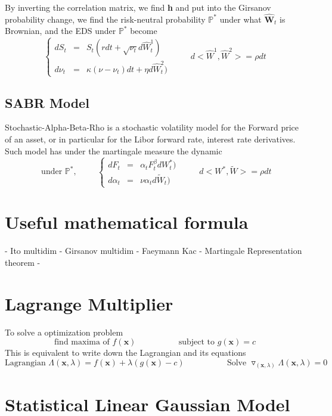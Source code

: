 \documentclass[a4paper,10pt]{article}
\begin{document}
By inverting the correlation matrix, we find \textbf{h} and put into the Girsanov probability change, we find the risk-neutral probability $\mathbb{P}^*$ under what $\hat{\textbf{W}}_t$ is Brownian, and the EDS under $\mathbb{P}^*$ become
\[
\left\{ 
\begin{array}{rcl}
dS_t    &=& S_t( r dt + \sqrt{\nu_t} d \hat{W}^{1}_t )  \\ 
d\nu_t  &=& \kappa( \nu -\nu_t ) dt + \eta d \hat{W}^{2}_t )
\end{array}\right. 
\hspace{1cm}
d<\hat{W}^{1},\hat{W}^{2}> = \rho dt
\]

\subsection{SABR Model}
Stochastic-Alpha-Beta-Rho is a stochastic volatility model for the Forward price of an asset, or in particular for the Libor forward rate, interest rate derivatives. Such model has under the martingale measure the dynamic  
\[
\text{ under }\mathbb{P}^*, 
\hspace{1cm}
\left\{ 
\begin{array}{rcl}
dF_t       &=&     \alpha_t F^{\beta}_t d W^{*}_t )  \\ 
d\alpha_t  &=& \nu \alpha_t d \widetilde{W}_t )
\end{array}\right. 
\hspace{1cm}
d< W^{*},\widetilde{W}> = \rho dt
\]


\section{Useful mathematical formula}
- Ito multidim
- Girsanov multidim
- Faeymann Kac
- Martingale Representation theorem
- 
\section{Lagrange Multiplier}
To solve a optimization problem 
\[
\text{find maxima of } f(\textbf{x})  
\hspace{2cm}
\text{ subject to } g(\textbf{x}) = c
\]
This is equivalent to write down the Lagrangian and its equations
\[
\text{Lagrangian }\Lambda(\textbf{x},\lambda) = f(\textbf{x}) + \lambda(g(\textbf{x}) -c ) 
\hspace{2cm}
\text{ Solve } \triangledown_{(\textbf{x},\lambda)} \Lambda(\textbf{x},\lambda) = 0
\]

\section{Statistical Linear Gaussian Model}
\end{document}
